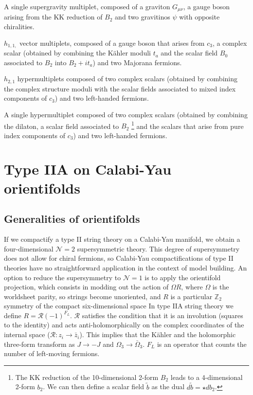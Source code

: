 A single supergravity multiplet, composed of a graviton $G_{\mu\nu}$, a gauge boson arising from the KK reduction of $B_2$ and two gravitinos $\psi$ with opposite chiralities. 

$h_{1,1,}$ vector multiplets, composed of a gauge boson that arises from $c_3$, a complex scalar (obtained by combining the Kähler moduli $t_a$ and the scalar field $B_0$ associated to $B_2$ into $B_2+it_a$) and two Majorana fermions.

$h_{2,1}$ hypermultiplets composed of two complex scalars (obtained by combining the complex structure moduli with the scalar fields associated to mixed index components of $c_3$) and two left-handed fermions.

A single hypermultiplet composed of two complex scalars (obtained by combining the dilaton, a scalar field associated to $B_2$
\footnote{The KK reduction of the 10-dimensional 2-form $B_2$ leads to a 4-dimensional 2-form $b_2$.
We can then define a scalar field $\tilde b$ as the dual $d \tilde b = \star d b_2$.} and the scalars that arise from pure index components of $c_3$) and two left-handed fermions.

\section{Type IIA on Calabi-Yau orientifolds}

\subsection{Generalities of orientifolds}
If we compactify a type II string theory on a Calabi-Yau manifold, we  obtain a four-dimensional
$\mathcal N=2$ supersymmetric theory.
This degree of supersymmetry does not allow for chiral fermions, so Calabi-Yau compactifications
of type II theories have no straightforward application in the context of model building.
An option to reduce the supersymmetry to $\mathcal N=1$  is to apply the orientifold
projection, which consists in modding out the action of $\Omega R$,
where $\Omega$ is the worldsheet parity, so strings become unoriented, and
$R$ is a particular $\mathbb Z_2$ symmetry of the compact six-dimensional space
In type IIA string theory we define $R=\mathcal R (-1)^{F_L}$.
$\mathcal R$ satisfies the condition that it is an involution (squares to the identity) and 
acts anti-holomorphically on the complex coordinates of the internal space ($\mathcal R: z_i \to \bar z_i$).
This implies that the Kähler and the holomorphic three-form transform as $J\to -J$ and $\Omega_3 \to \bar \Omega_3$.
$F_L$ is an operator that counts the number of left-moving fermions.

